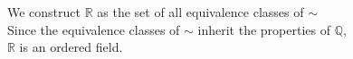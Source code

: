 \documentclass[preview]{standalone}
\begin{document}
\begin{center}
We construct $\mathbb{R}$ as the set of all equivalence classes of $\sim$\\Since the equivalence classes of $\sim$ inherit the properties of $\mathbb{Q}$,\\$\mathbb{R}$ is an ordered field.
\end{center}
\end{document}
